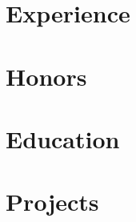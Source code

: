 \documentclass[letterpaper,11pt]{article}
\newif\ifML  %
\newif\ifNLP  %
\newif\ifFrontend  %
\newif\ifLowLevel  %
\newif\ifHardware  %
\begin{document}
  

  \section[Expeirence]{{\small\faBriefcase}~Experience}
    \resumeSubHeadingListStart
      
      
      
    \resumeSubHeadingListEnd

  \section[Honors]{{\small\faTrophy}~Honors}
    

  \ifNLP
    \section[Publications]{{\small\faBook}~Publications}
    
  \fi

  \section[Education]{{\small\faSchool}~Education}
    \resumeSubHeadingListStart
      
      
      \ifHardware
        
      \fi
    \resumeSubHeadingListEnd

  \section[Projects]{{\small\faLaptopCode}~Projects}
    \resumeSubHeadingListStart
      \ifML
        
        
      \fi
      \ifFrontend
      \fi

      \ifLowLevel
        
        
      \fi
\end{document}
